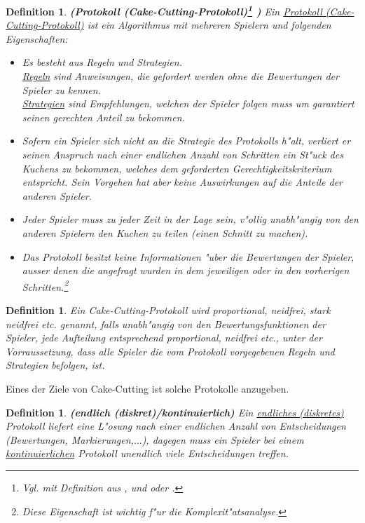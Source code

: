 \documentclass[11pt, a4paper, twoside]{article}
\newcommand{\markup}[1]{\uline{#1}}
\let\abk\nomenclature
\newtheorem{defi}[satz]{Definition}
\numberwithin{equation}{section}
\begin{document}
\begin{defi}{\textbf{(Protokoll (Cake-Cutting-Protokoll)\footnote{Vgl. mit Definition aus \cite{3}, \cite{35} und \cite{24} oder \cite{34}\abk{CC}{\markup{C}ake-\markup{C}utting}.}
)}}
\newline Ein \underline{Protokoll (Cake-Cutting-Protokoll)} ist ein Algorithmus mit mehreren Spielern und folgenden Eigenschaften:
\begin{itemize}
\item{Es besteht aus Regeln und Strategien.\\ \underline{Regeln} sind Anweisungen, die gefordert werden ohne die Bewertungen der Spieler zu kennen.\\ \underline{Strategien} sind Empfehlungen, welchen der Spieler folgen muss um garantiert seinen gerechten Anteil zu bekommen.
}
\item{Sofern ein Spieler sich nicht an die Strategie des Protokolls h"alt, verliert er seinen Anspruch nach einer endlichen Anzahl von Schritten ein St"uck des Kuchens zu bekommen, welches dem geforderten Gerechtigkeitskriterium entspricht. Sein Vorgehen hat aber keine Auswirkungen auf die Anteile der anderen Spieler.}
\item Jeder Spieler muss zu jeder Zeit in der Lage sein, v"ollig unabh"angig von den anderen Spielern den Kuchen zu teilen (einen Schnitt zu machen).
\item Das Protokoll besitzt keine Informationen "uber die Bewertungen der Spieler, ausser denen die angefragt wurden in dem jeweiligen oder in den vorherigen Schritten.\footnote{Diese Eigenschaft ist wichtig f"ur die Komplexit"atsanalyse.}
\end{itemize}
\end{defi}
\begin{defi}
Ein Cake-Cutting-Protokoll wird proportional, neidfrei, stark neidfrei etc. genannt, falls unabh"angig von den Bewertungsfunktionen der Spieler, jede Aufteilung entsprechend proportional, neidfrei etc., unter der Vorraussetzung, dass alle Spieler die vom Protokoll vorgegebenen Regeln und Strategien befolgen, ist.
\end{defi}
Eines der Ziele von Cake-Cutting ist solche Protokolle anzugeben.\begin{defi}{\textbf{(endlich (diskret)/kontinuierlich)}}
\newline Ein \underline{endliches (diskretes)} Protokoll liefert eine L"osung nach einer endlichen Anzahl von Entscheidungen (Bewertungen, Markierungen,$\ldots$), dagegen muss ein Spieler bei einem \underline{kontinuierlichen} Protokoll unendlich viele Entscheidungen treffen.
\end{defi}
\end{document}
